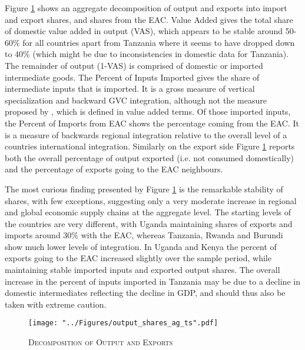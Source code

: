 \documentclass[a4paper]{article}
\begin{document}
Figure \ref{fig:outshares_ag_ts} shows an aggregate decomposition of output and exports into import and export shares, and shares from the EAC. Value Added gives the total share of domestic value added in output (VAS), which appears to be stable around 50-60\% for all countries apart from Tanzania where it seems to have dropped down to 40\% (which might be due to inconsistencies in domestic data for Tanzania). The remainder of output (1-VAS) is comprised of domestic or imported intermediate goods. The Percent of Inputs Imported gives the share of intermediate inputs that is imported. It is a gross measure of vertical specialization and backward GVC integration, although not the measure proposed by \citet{hummels2001nature}, which is defined in value added terms. Of those imported inputs, the Percent of Imports from EAC shows the percentage coming from the EAC. It is a measure of backwards regional integration relative to the overall level of a countries international integration.  Similarly on the export side Figure \ref{fig:outshares_ag_ts} reports both the overall percentage of output exported (i.e. not consumed domestically) and the percentage of exports going to the EAC neighbours. \newline

The most curious finding presented by Figure \ref{fig:outshares_ag_ts} is the remarkable stability of shares, with few exceptions, suggesting only a very moderate increase in regional and global economic supply chains at the aggregate level. The starting levels of the countries are very different, with Uganda maintaining shares of exports and imports around 30\% with the EAC, whereas Tanzania, Rwanda and Burundi show much lower levels of integration. In Uganda and Kenya the percent of exports going to the EAC increased slightly over the sample period, while maintaining stable imported inputs and exported output shares. The overall increase in the percent of inputs imported in Tanzania may be due to a decline in domestic intermediates reflecting the decline in GDP, and should thus also be taken with extreme caution.  


\begin{figure}[h!]
\centering
\caption{\label{fig:outshares_ag_ts}\textsc{Decomposition of Output and Exports}}
\texttt{[image: "../Figures/output\_shares\_ag\_ts".pdf]} %
\end{figure}
\FloatBarrier
\end{document}
